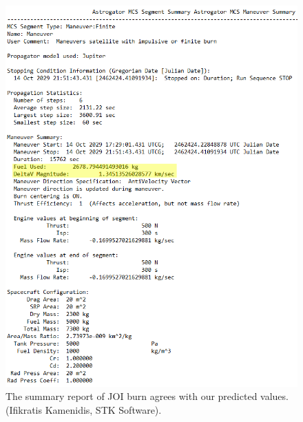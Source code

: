 \begin{figure}[htb!]
\centering
\includegraphics[scale=0.5]{figures/Orbiter/JOIres.png}
\caption{The summary report of JOI burn agrees with our predicted values.(Ifikratis Kamenidis, STK Software).}
\end{figure}

